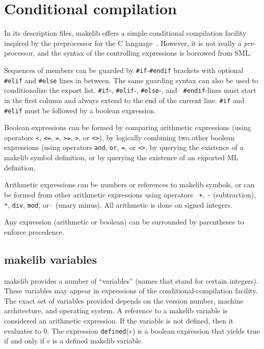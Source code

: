 
\section{Conditional compilation}
\label{sec:preproc}

In its description files, makelib offers a simple conditional compilation
facility inspired by the preprocessor for the C language~\cite{k&r2}.
However, it is not really a {\it pre}-processor, and the syntax of the
controlling expressions is borrowed from SML.

Sequences of members can be guarded by {\tt \#if}-{\tt \#endif}
brackets with optional {\tt \#elif} and {\tt \#else} lines in between.
The same guarding syntax can also be used to conditionalize the export
list.  {\tt \#if}-, {\tt \#elif}-, {\tt \#else}-, and {\tt
\#endif}-lines must start in the first column and always
extend to the end of the current line.  {\tt \#if} and {\tt \#elif}
must be followed by a boolean expression.

Boolean expressions can be formed by comparing arithmetic expressions
(using operators {\tt <}, {\tt <=}, {\tt =}, {\tt >=}, {\tt >}, or
{\tt <>}), by logically combining two other boolean expressions (using
operators {\tt and}, {\tt or}, {\tt =}, or {\tt <>}, by
querying the existence of a makelib symbol definition, or by querying the
existence of an exported ML definition.

Arithmetic expressions can be numbers or references to makelib symbols, or
can be formed from other arithmetic expressions using operators {\tt
+}, {\tt -} (subtraction), \verb|*|, {\tt div}, {\tt mod}, or $\tilde{~}$
(unary minus).  All arithmetic is done on signed integers.

Any expression (arithmetic or boolean) can be surrounded by
parentheses to enforce precedence.

\subsection{makelib variables}
\label{sec:cmvars}

makelib provides a number of ``variables'' (names that stand for certain
integers). These variables may appear in expressions of the
conditional-compilation facility. The exact set of variables provided
depends on the version number, machine architecture, and
operating system.  A reference to a makelib variable is considered an
arithmetic expression. If the variable is not defined, then it
evaluates to 0.  The expression {\tt defined}($v$) is a boolean
expression that yields true if and only if $v$ is a defined makelib
variable.

